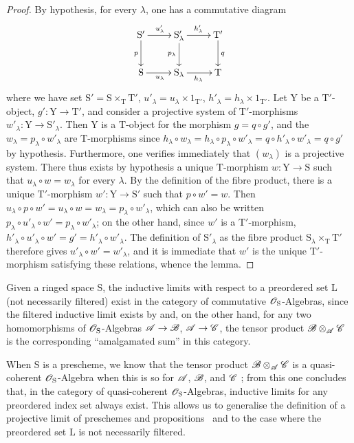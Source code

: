 \begin{proof}
By hypothesis, for every $\lambda$, one has a commutative diagram
\[
\xymatrix{
  \mathrm{S}' \ar[r]^{u'_\lambda} \ar[d]_p & \mathrm{S}'_\lambda \ar[r]^{h'_\lambda} \ar[d]_{p_\lambda} & \mathrm{T}' \ar[d]^q \\
  \mathrm{S} \ar[r]_{u_\lambda} & \mathrm{S}_\lambda \ar[r]_{h_\lambda} & \mathrm{T}
}
\]
where we have set $\mathrm{S}'=\mathrm{S}\times_\mathrm{T}\mathrm{T}'$, $u'_\lambda=u_\lambda\times 1_{\mathrm{T}'}$, $h'_\lambda=h_\lambda\times 1_{\mathrm{T}'}$.
Let $\mathrm{Y}$ be a $\mathrm{T}'$-object, $g':\mathrm{Y}\to\mathrm{T}'$, and consider a projective system of $\mathrm{T}'$-morphisms $w'_\lambda:\mathrm{Y}\to\mathrm{S}'_\lambda$.
Then $\mathrm{Y}$ is a $\mathrm{T}$-object for the morphism $g=q\circ g'$, and the $w_\lambda=p_\lambda\circ w'_\lambda$ are $\mathrm{T}$-morphisms since $h_\lambda\circ w_\lambda=h_\lambda\circ p_\lambda\circ w'_\lambda=q\circ h'_\lambda\circ w'_\lambda=q\circ g'$ by hypothesis.
Furthermore, one verifies immediately that $(w_\lambda)$ is a projective system.
There thus exists by hypothesis a unique $\mathrm{T}$-morphism $w:\mathrm{Y}\to\mathrm{S}$ such that $u_\lambda\circ w=w_\lambda$ for every $\lambda$.
By the definition of the fibre product, there is a unique $\mathrm{T}'$-morphism $w':\mathrm{Y}\to\mathrm{S}'$ such that $p\circ w'=w$.
Then $u_\lambda\circ p\circ w'=u_\lambda\circ w=w_\lambda=p_\lambda\circ w'_\lambda$, which can also be written $p_\lambda\circ u'_\lambda\circ w'=p_\lambda\circ w'_\lambda$; on the other hand, since $w'$ is a $\mathrm{T}'$-morphism, $h'_\lambda\circ u'_\lambda\circ w'=g'=h'_\lambda\circ w'_\lambda$. The definition of $\mathrm{S}'_\lambda$ as the fibre product $\mathrm{S}_\lambda\times_\mathrm{T}\mathrm{T}'$ therefore gives $u'_\lambda\circ w'=w'_\lambda$, and it is immediate that $w'$ is the unique $\mathrm{T}'$-morphism satisfying these relations, whence the lemma.
\end{proof}

\begin{remark}[8.2.7]
\label{IV.8.2.7}
Given a ringed space $\mathrm{S}$, the inductive limits with respect to a preordered set $\mathrm{L}$ (not necessarily filtered) exist in the category of commutative $\mathscr{O}_\mathrm{S}$-Algebras, since the filtered inductive limit exists by  and, on the other hand, for any two homomorphisms of $\mathscr{O}_\mathrm{S}$-Algebras $\mathscr{A}\to\mathscr{B}$, $\mathscr{A}\to\mathscr{C}$, the tensor product $\mathscr{B}\otimes_{\mathscr{A}}\mathscr{C}$ is the corresponding ``amalgamated sum'' in this category.

When $\mathrm{S}$ is a prescheme, we know that the tensor product $\mathscr{B}\otimes_{\mathscr{A}}\mathscr{C}$ is a quasi-coherent $\mathscr{O}_\mathrm{S}$-Algebra when this is so for $\mathscr{A}$, $\mathscr{B}$, and $\mathscr{C}$ ; from this one concludes that, in the category of quasi-coherent $\mathscr{O}_\mathrm{S}$-Algebras, inductive limits for any preordered index set always exist.
This allows us to generalise the definition of a projective limit of preschemes and propositions~ and  to the case where the preordered set $\mathrm{L}$ is not necessarily filtered.
\end{remark}

